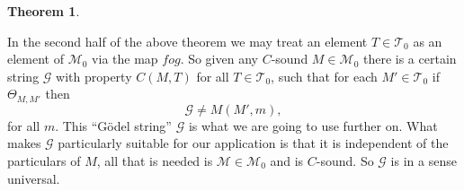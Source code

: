 \documentclass{amsart}  %
\numberwithin{equation}{section}
\newtheorem{theorem}[equation]{Theorem}
\theoremstyle{definition}
\theoremstyle{remark}
\newtheorem{question}{Question}
\begin{document}
{\begin{theorem}
\end{theorem}
In the second half of the above theorem we may treat an element $T \in \mathcal{T} _{0} $ as an element of $\mathcal{M} _{0} $ via the map $fog$. So given any $C$-sound $M \in \mathcal{M} _{0} $ there is a certain string $\mathcal{G}$ with property $C (M,T)$ for all $T \in \mathcal{T} _{0} $, such that for each $M' \in \mathcal{T} _{0} $ if $\Theta _{M,M'} $ then $$\mathcal{G}  \neq M (M',m),$$ for all $m$.  This ``G\"odel string'' $\mathcal{G} $  is what we are going to use further on. What makes $\mathcal{G}$ particularly suitable for our application is that it is independent of the particulars of $M$, all that is needed is $\mathcal{M} \in \mathcal{M} _{0} $ and is $C$-sound. So $\mathcal{G}$ is in a sense universal.  %
   
}
\end{document}
